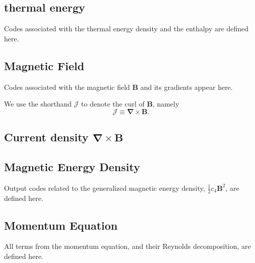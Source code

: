 \documentclass[10pt,letterpaper]{article}
\begin{document}
\subsection{thermal energy}
Codes associated with the thermal energy density and the enthalpy are defined here. 




\subsection{Magnetic Field}
Codes associated with the magnetic field $\boldsymbol{B}$ and its gradients appear here.






We use the shorthand $\boldsymbol{\mathcal{J}}$ to denote the curl of $\boldsymbol{B}$, namely
\begin{equation}
    \boldsymbol{\mathcal{J}}\equiv\boldsymbol{\nabla}\times\boldsymbol{B}.
\end{equation}
\subsection{Current density $\boldsymbol{\nabla}\times\boldsymbol{B}$}




\subsection{Magnetic Energy Density}
Output codes related to the generalized magnetic energy density, $\frac{1}{2}c_4\boldsymbol{B}^2$, are defined here.




\subsection{Momentum Equation}
All terms from the momentum equation, and their Reynolds decomposition, are defined here.




\end{document}
